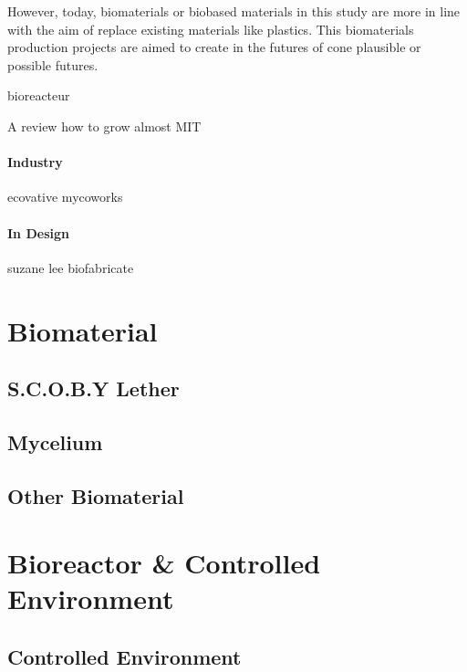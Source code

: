 However, today, biomaterials or biobased materials in this study are more in line with the aim of replace existing materials like plastics.
This biomaterials production projects are aimed to create in the futures of cone plausible or possible futures.

bioreacteur 

A review 
how to grow almost  MIT 

\paragraph[short]{Industry} 
ecovative mycoworks 

\paragraph[short]{In Design} 

suzane lee biofabricate 




\section{Biomaterial}
\subsection{S.C.O.B.Y Lether} 


\subsection{Mycelium}


\subsection{Other Biomaterial}




















\section{Bioreactor \& Controlled Environment }

\subsection{Controlled Environment} 




















